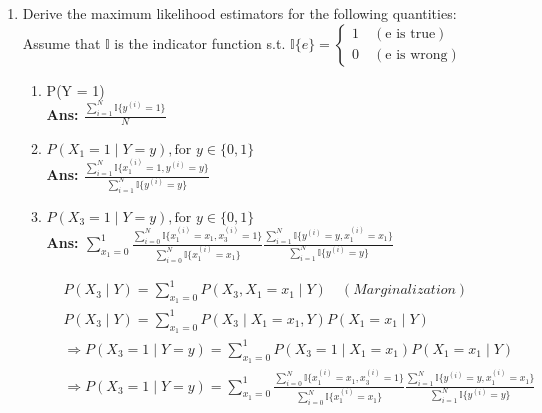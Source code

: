 \documentclass{article}
\theoremstyle{definition}
\theoremstyle{remark}
\begin{document}
\begin{enumerate}[font={\Large\bfseries},left=0pt]
\begin{tcolorbox}
\begin{enumerate}
\begin{enumerate}
				      \item Derive the maximum likelihood estimators for the following quantities: \\
				            Assume that $\mathbb{I}$ is the indicator function s.t. $\mathbb{I}\{e\} = \begin{cases}1 \quad (\text{e is true}) \\ 0 \quad (\text{e is wrong})\end{cases}$
				            \begin{enumerate}
					            \item P(Y = 1) \\
					                  \textbf{Ans: $\frac{\sum^{N}_{i = 1} \mathbb{I}\{y^{(i)} = 1\}}{N}$}
					            \item $P(X_1 = 1 \mid Y = y), \text{for } y \in \{0, 1\}$  \\
					                  \textbf{Ans: $\frac{\sum^{N}_{i = 1}\mathbb{I}\{x_1^{(i)} = 1, y^{(i)} = y\}}{\sum^{N}_{i = 1} \mathbb{I}\{y^{(i)} = y\}}$}
					            \item $P(X_3 = 1 \mid Y = y), \text{for } y \in \{0, 1\}$  \\
					                  \textbf{Ans: $\sum^{1}_{x_1 = 0} \frac{\sum^{N}_{i = 0} \mathbb{I}\{x^{(i)}_1 = x_1, x_3^{(i)} = 1\}}{\sum^{N}_{i = 0} \mathbb{I}\{x^{(i)}_1 = x_1\}} \frac{\sum^{N}_{i = 1} \mathbb{I}\{y^{(i)} = y, x^{(i)}_1 = x_1  \}}{\sum^{N}_{i = 1} \mathbb{I}\{y^{(i)} = y\}}$}

					                  \begin{align}
						                   & P(X_3 \mid Y) = \sum^{1}_{x_1 = 0} P(X_3, X_1 = x_1 \mid Y) \quad (Marginalization)                                                                                                                                                                                                          \\
						                   & P(X_3 \mid Y) = \sum^{1}_{x_1 = 0} P(X_3 \mid X_1 = x_1, Y) P(X_1 = x_1 \mid Y)                                                                                                                                                                                                              \\
						                   & \Rightarrow P(X_3 = 1 \mid Y = y) = \sum^{1}_{x_1 = 0} P(X_3 = 1 \mid X_1 = x_1)P(X_1 = x_1 \mid Y)                                                                                                                                                                                          \\
						                   & \Rightarrow P(X_3 = 1 \mid Y = y) = \sum^{1}_{x_1 = 0} \frac{\sum^{N}_{i = 0} \mathbb{I}\{x^{(i)}_1 = x_1, x_3^{(i)} = 1\}}{\sum^{N}_{i = 0} \mathbb{I}\{x^{(i)}_1 = x_1\}} \frac{\sum^{N}_{i = 1} \mathbb{I}\{y^{(i)} = y, x^{(i)}_1 = x_1  \}}{\sum^{N}_{i = 1} \mathbb{I}\{y^{(i)} = y\}}
					                  \end{align}


\end{enumerate}
\end{enumerate}
\end{enumerate}
\end{tcolorbox}
\end{enumerate}
\end{document}
